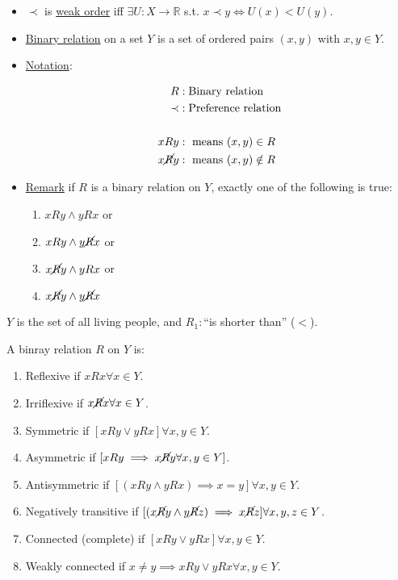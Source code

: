 \documentclass{article}
\def\reals{\mathbb{R}}
\def\noR{\cancel{R}}
\begin{document}
\begin{itemize}
\item $\prec$ is \underline{weak order} iff $\exists U:X\to\reals$ s.t. $x\prec y
\iff U(x)<U(y)$.

\item \underline{Binary relation} on a set $Y$ is a set of ordered pairs $(x,y)$
with $x,y\in Y$.

\item \underline{Notation}:

\begin{align*}
R&:\text{Binary relation} \\
\prec&:\text{Preference relation}\\\\
xRy&: \text{ means }(x,y) \in R \\
x\noR y&:\text{ means }(x,y)\notin R
\end{align*}

\item \underline{Remark} if $R$ is a binary relation on $Y$, exactly one of the
following is true:
\begin{enumerate}
\item $xRy \wedge yRx$ or 
\item $xRy \wedge y\noR x$ or 
\item $x\noR y \wedge yRx$ or 
\item $x\noR y \wedge y\noR x$

\end{enumerate}
\end{itemize}

 $Y$ is the set of all living people, and $R_1:$``is shorter
than'' ($<$).

 A binray relation $R$ on $Y$ is:
\begin{enumerate}
\item Reflexive if $xRx \forall x\in Y$.
\item Irriflexive if $x\cancel{R}x \forall x\in Y$.
\item Symmetric if $[xRy \vee yRx] \forall x,y\in Y$.
\item Asymmetric if $[xRy\implies x\noR y \forall x,y\in Y]$.
\item Antisymmetric if $[(xRy \wedge yRx)\implies x=y] \forall x,y\in Y$.
\item Negatively transitive if $[(x\noR y \wedge y\noR z)\implies x\noR z] \forall
x,y,z\in Y$.
\item Connected (complete) if $[xRy \vee yRx] \forall x,y\in Y$.
\item Weakly connected if $x\not=y\implies xRy \vee yRx\forall x,y\in Y$.
\end{enumerate}
\end{document}

